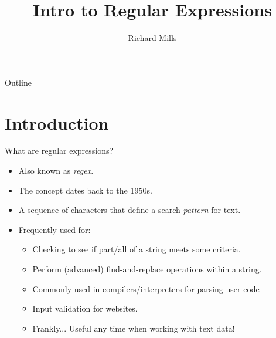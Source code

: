 \documentclass[
	usenames,
	dvipsnames,
] {beamer}
\title{Intro to Regular Expressions}
\author{Richard Mills}
\date{}
\begin{document}
\maketitle

\begin{frame}{Outline}
	\tableofcontents
\end{frame}
				
\section{Introduction}
\begin{frame}{What are regular expressions?}
	\begin{itemize}[label=\textbullet]
		\item Also known as \textit{regex}.
		      \pause
		\item The concept dates back to the 1950s.
			\pause
		\item A sequence of characters that define a search \textit{pattern} for text.
		      \pause
		\item Frequently used for:
		      	\begin{itemize}[label=\textendash]
			      	\item Checking to see if part/all of a string meets some criteria.
			      	      \pause
			      	\item Perform (advanced) find-and-replace operations within a string.
			      	      \pause
			      	\item Commonly used in compilers/interpreters for parsing user code
			      	      \pause
			      	\item Input validation for websites.
			      		\pause
				\item Frankly... Useful any time when working with text data!
		      	\end{itemize}
	\end{itemize}
\end{frame}
\end{document}
